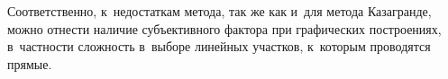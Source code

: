 Соответственно, к~недостаткам метода, так же как и~для метода Казагранде, можно отнести наличие субъективного фактора при графических построениях, в~частности сложность в~выборе линейных участков, к~которым проводятся прямые.


 
